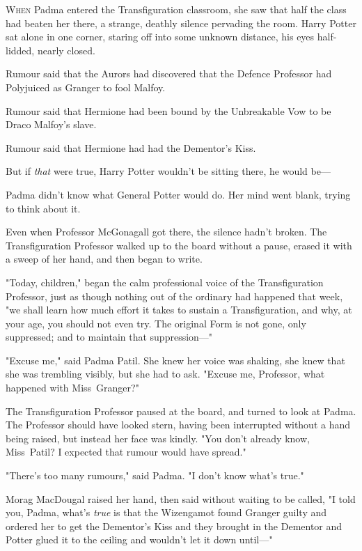 
\lettrine{W}{hen} Padma
entered the Transfiguration classroom, she saw that half the class had beaten
her there, a strange, deathly silence pervading the room. Harry Potter sat
alone in one corner, staring off into some unknown distance, his eyes
half-lidded, nearly closed.

Rumour said that the Aurors had discovered that the Defence Professor had
Polyjuiced as Granger to fool Malfoy.

Rumour said that Hermione had been bound by the Unbreakable Vow to be Draco
Malfoy’s slave.

Rumour said that Hermione had had the Dementor’s Kiss.

But if \emph{that} were true, Harry Potter wouldn’t be sitting there, he would
be—

Padma didn’t know what General Potter would do. Her mind went blank, trying to
think about it.

Even when Professor McGonagall got there, the silence hadn’t broken. The
Transfiguration Professor walked up to the board without a pause, erased it
with a sweep of her hand, and then began to write.

"Today, children," began the calm professional voice of the Transfiguration
Professor, just as though nothing out of the ordinary had happened that week,
"we shall learn how much effort it takes to sustain a Transfiguration, and why,
at your age, you should not even try. The original Form is not gone, only
suppressed; and to maintain that suppression—"

"Excuse me," said Padma Patil. She knew her voice was shaking, she knew that
she was trembling visibly, but she had to ask. "Excuse me, Professor, what
happened with Miss~Granger?"

The Transfiguration Professor paused at the board, and turned to look at Padma.
The Professor should have looked stern, having been interrupted without a hand
being raised, but instead her face was kindly. "You don’t already know,
Miss~Patil? I expected that rumour would have spread."

"There’s too many rumours," said Padma. "I don’t know what’s true."

Morag MacDougal raised her hand, then said without waiting to be called, "I
told you, Padma, what’s \emph{true} is that the Wizengamot found Granger guilty
and ordered her to get the Dementor’s Kiss and they brought in the Dementor and
Potter glued it to the ceiling and wouldn’t let it down until—"

